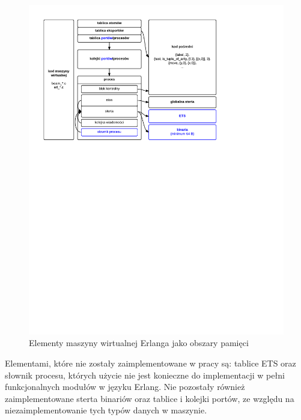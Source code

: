 \begin{figure}[h]
\centerline{\includegraphics[scale=1, clip, trim=10mm 165mm 55mm 10mm]{erts_memory}}
\caption{Elementy maszyny wirtualnej Erlanga jako obszary pamięci}
\label{fig:ertsmemory}
\end{figure}

Elementami, które nie zostały zaimplementowane w pracy są: tablice ETS oraz słownik procesu, których użycie nie jest konieczne do implementacji w pełni funkcjonalnych modułów w języku Erlang. Nie pozostały również zaimplementowane sterta binariów oraz tablice i kolejki portów, ze względu na niezaimplementowanie tych typów danych w maszynie.